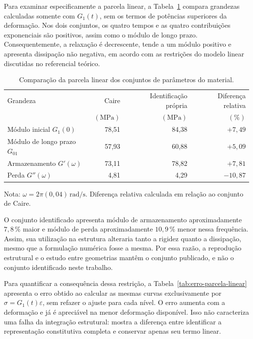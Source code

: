 \documentclass[arial,centeredequations,english,brazilian,oneside,section=TITLE]{ifes8}
\begin{document}
Para examinar especificamente a parcela linear, a
Tabela~\ref{tab:comparacao-material-linear} compara grandezas calculadas
somente com $G_1(t)$, sem os termos de potências superiores da deformação.
Nos dois conjuntos, os quatro tempos e as quatro contribuições
exponenciais são positivos, assim como o módulo de longo prazo.
Consequentemente, a relaxação é decrescente, tende a um módulo positivo
e apresenta dissipação não negativa, em acordo com as restrições do
modelo linear discutidas no referencial teórico.

\begin{table}[!htbp]
  \centering
  \caption{Comparação da parcela linear dos conjuntos de parâmetros do material.}
  \label{tab:comparacao-material-linear}
  \begin{tabular}{lrrr}
    \hline
    Grandeza & Caire & Identificação própria & Diferença relativa\\
    & $(\mathrm{MPa})$ & $(\mathrm{MPa})$ & $(\%)$\\
    \hline
    Módulo inicial $G_1(0)$ & 78,51 & 84,38 & $+7{,}49$\\
    Módulo de longo prazo $G_{01}$ & 57,93 & 60,88 & $+5{,}09$\\
    Armazenamento $G'(\omega)$ & 73,11 & 78,82 & $+7{,}81$\\
    Perda $G''(\omega)$ & 4,81 & 4,29 & $-10{,}87$\\
    \hline
  \end{tabular}
  \smallskip
  {\small Nota: $\omega=2\pi(0{,}04)\,\mathrm{rad/s}$.
  Diferença relativa calculada em relação ao conjunto de Caire.}
\end{table}

O conjunto identificado apresenta módulo de armazenamento aproximadamente
$7{,}8\,\%$ maior e módulo de perda aproximadamente $10{,}9\,\%$ menor
nessa frequência. Assim, sua utilização na estrutura alteraria tanto a
rigidez quanto a dissipação, mesmo que a formulação numérica fosse a mesma.
Por essa razão, a reprodução estrutural e o estudo entre geometrias
mantêm o conjunto publicado, e não o conjunto identificado neste trabalho.

Para quantificar a consequência dessa restrição, a
Tabela~\ref{tab:erro-parcela-linear} apresenta o erro obtido ao calcular
as mesmas curvas exclusivamente por
$\sigma=G_1(t)\varepsilon$, sem refazer o ajuste para cada nível.
O erro aumenta com a deformação e já é apreciável na menor deformação
disponível. Isso não caracteriza uma falha da integração estrutural:
mostra a diferença entre identificar a representação constitutiva completa
e conservar apenas seu termo linear.
\end{document}
